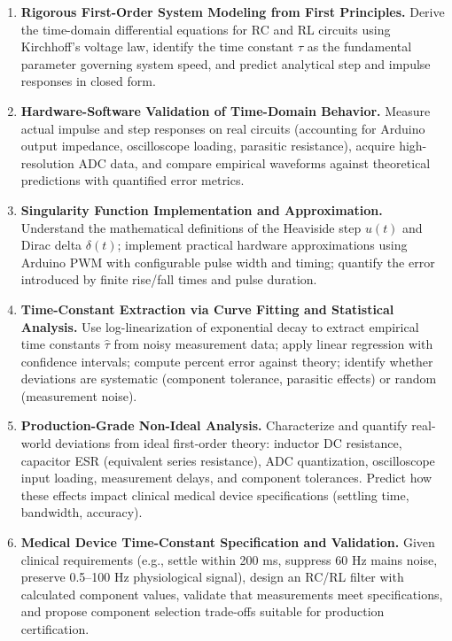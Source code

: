 \documentclass[11pt,letterpaper]{article}
\begin{document}
\begin{enumerate}
    \item \textbf{Rigorous First-Order System Modeling from First Principles.} Derive the time-domain differential equations for RC and RL circuits using Kirchhoff's voltage law, identify the time constant $\tau$ as the fundamental parameter governing system speed, and predict analytical step and impulse responses in closed form.

    \item \textbf{Hardware-Software Validation of Time-Domain Behavior.} Measure actual impulse and step responses on real circuits (accounting for Arduino output impedance, oscilloscope loading, parasitic resistance), acquire high-resolution ADC data, and compare empirical waveforms against theoretical predictions with quantified error metrics.

    \item \textbf{Singularity Function Implementation and Approximation.} Understand the mathematical definitions of the Heaviside step $u(t)$ and Dirac delta $\delta(t)$; implement practical hardware approximations using Arduino PWM with configurable pulse width and timing; quantify the error introduced by finite rise/fall times and pulse duration.

    \item \textbf{Time-Constant Extraction via Curve Fitting and Statistical Analysis.} Use log-linearization of exponential decay to extract empirical time constants $\hat{\tau}$ from noisy measurement data; apply linear regression with confidence intervals; compute percent error against theory; identify whether deviations are systematic (component tolerance, parasitic effects) or random (measurement noise).

    \item \textbf{Production-Grade Non-Ideal Analysis.} Characterize and quantify real-world deviations from ideal first-order theory: inductor DC resistance, capacitor ESR (equivalent series resistance), ADC quantization, oscilloscope input loading, measurement delays, and component tolerances. Predict how these effects impact clinical medical device specifications (settling time, bandwidth, accuracy).

    \item \textbf{Medical Device Time-Constant Specification and Validation.} Given clinical requirements (e.g., settle within 200 ms, suppress 60 Hz mains noise, preserve 0.5--100 Hz physiological signal), design an RC/RL filter with calculated component values, validate that measurements meet specifications, and propose component selection trade-offs suitable for production certification.
\end{enumerate}
\end{document}
